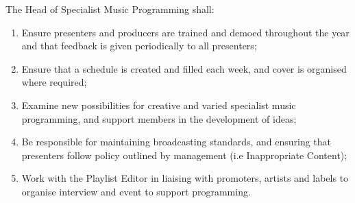 \item The Head of Specialist Music Programming shall:
\begin{enumerate}[label*=\arabic*.]
    \item Ensure presenters and producers are trained and demoed throughout the year and that feedback is given periodically to all presenters;
    \item Ensure that a schedule is created and filled each week, and cover is organised where required;
    \item Examine new possibilities for creative and varied specialist music programming, and support members in the development of ideas;
    \item Be responsible for maintaining broadcasting standards, and ensuring that presenters follow policy outlined by management (i.e Inappropriate Content);
    \item Work with the Playlist Editor in liaising with promoters, artists and labels to organise interview and event to support programming.
\end{enumerate}

